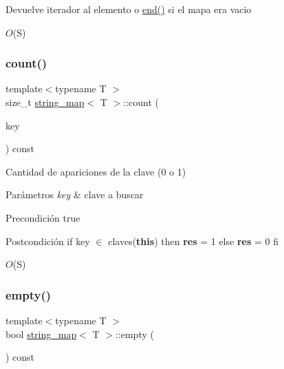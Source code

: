 \begin{DoxyReturn}{Devuelve}
iterador al elemento o \mbox{\hyperlink{classstring__map_ab063b2f78945d192c5ef3ccc68db8e80}{end()}} si el mapa era vacio
\end{DoxyReturn}

\begin{DoxyDescription}
\item[Complejidad Temporal]$O$(S)
\end{DoxyDescription}\mbox{\label{classstring__map_aaca5a3ee235d2e7dd09e58385fff4f47}} 
\subsubsection{\texorpdfstring{count()}{count()}}
{\footnotesize\ttfamily template$<$typename T $>$ \\
size\+\_\+t \mbox{\hyperlink{classstring__map}{string\+\_\+map}}$<$ T $>$\+::count (\begin{DoxyParamCaption}\item[{const key\+\_\+type \&}]{key }\end{DoxyParamCaption}) const}



Cantidad de apariciones de la clave (0 o 1) 


\begin{DoxyParams}{Parámetros}
{\em key} & clave a buscar\\
\hline
\end{DoxyParams}
\begin{DoxyPrecond}{Precondición}
true 
\end{DoxyPrecond}
\begin{DoxyPostcond}{Postcondición}
if key $\in$ claves({\bfseries this}) then {\bfseries res} = 1 else {\bfseries res} = 0 fi
\end{DoxyPostcond}

\begin{DoxyDescription}
\item[Complejidad Temporal]$O$(S)
\end{DoxyDescription}\mbox{\label{classstring__map_a55e9dbcd6209953b93c7a98d93e154b6}} 
\subsubsection{\texorpdfstring{empty()}{empty()}}
{\footnotesize\ttfamily template$<$typename T $>$ \\
bool \mbox{\hyperlink{classstring__map}{string\+\_\+map}}$<$ T $>$\+::empty (\begin{DoxyParamCaption}{ }\end{DoxyParamCaption}) const}



